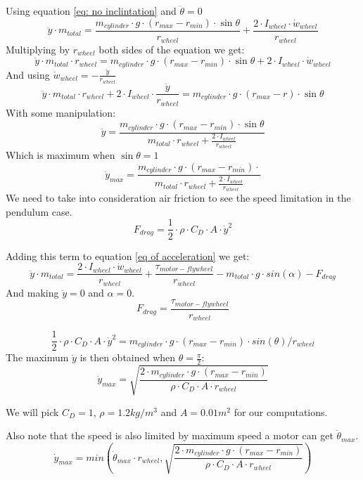 \begin{enumerate}
    Using equation \ref{eq: no inclintation} and $\ddot{\theta} = 0$
    \[\ddot{y}\cdot m_{total} = \frac{m_{cylinder} \cdot  g \cdot  (r_{max} - r_{min}) \cdot  \sin{\theta}}{r_{wheel}} +\frac{2\cdot I_{wheel} \cdot  \dot{w}_{wheel}}{r_{wheel}}\]
    Multiplying by $r_{wheel}$ both sides of the equation we get:
    \[\ddot{y}\cdot m_{total} \cdot  r_{wheel} = m_{cylinder} \cdot  g \cdot  (r_{max}-r_{min}) \cdot  \sin{\theta} + 2\cdot I_{wheel} \cdot  \dot{w}_{wheel}\]
    And using $\dot{w}_{wheel} = -\frac{\ddot{y}}{r_{wheel}}$
    \[\ddot{y}\cdot m_{total} \cdot  r_{wheel} + 2\cdot  I_{wheel} \cdot  \frac{\ddot{y}}{r_{wheel}} = m_{cylinder} \cdot  g \cdot  (r_{max}-r) \cdot  \sin{\theta} \]
    With some manipulation:
    \[\ddot{y}  = \frac{m_{cylinder} \cdot  g \cdot  (r_{max}-r_{min}) \cdot  \sin{\theta}}{m_{total} \cdot  r_{wheel} + \frac{2\cdot I_{wheel}}{r_{wheel}} }  \]
    Which is maximum when $\sin{\theta}=1$
    \begin{equation}
        \boxed{ \ddot{y}_{max}  = \frac{m_{cylinder} \cdot  g \cdot  (r_{max}-r_{min}) \cdot}{m_{total} \cdot  r_{wheel} + \frac{2\cdot I_{wheel}}{r_{wheel}} } }
        \label{maximum acceleration pendulum}
    \end{equation}
    We need to take into consideration air friction to see the speed limitation in the pendulum case.
    \[F_{drag} = \frac{1}{2}\cdot \rho\cdot C_D \cdot  A \cdot  \dot{y}^2 \]

    Adding this term to equation \ref{eq of acceleration} we get:
    \[  \ddot{y}\cdot m_{total} = \frac{2\cdot I_{wheel} \cdot  \dot{w}_{wheel}}{r_{wheel}} + \frac{\tau_{motor-flywheel}}{r_{wheel}} - m_{total} \cdot  g \cdot  sin(\alpha) - F_{drag} \]
    And making $\ddot{y} = 0$ and $\alpha = 0$.
    \[  F_{drag} = \frac{\tau_{motor-flywheel}}{r_{wheel}}\]

    \[\frac{1}{2}\cdot \rho\cdot C_D \cdot  A \cdot  \dot{y}^2 = m_{cylinder} \cdot  g \cdot  (r_{max} - r_{min})\cdot sin(\theta) / r_{wheel} \]
    The maximum $\dot{y}$ is then obtained when $\theta=\frac{\pi}{2}$:
    \begin{equation*}
        \dot{y}_{max} = \sqrt{\frac{2\cdot m_{cylinder} \cdot  g \cdot  (r_{max} - r_{min})}{\rho\cdot C_D \cdot  A \cdot  r_{wheel}} }
    \end{equation*}

    We will pick $C_D=1$, $\rho=1.2 kg/m^3$ and $A=0.01 m^2$ for our computations.

    Also note that the speed is also limited by maximum speed a motor can get
    $\dot{\theta}_{max}$.
    \begin{equation}
        \boxed{\dot{y}_{max} = min(\dot{\theta}_{max}\cdot r_{wheel}, \sqrt{\frac{2\cdot m_{cylinder} \cdot  g \cdot  (r_{max} - r_{min})}{\rho\cdot C_D \cdot  A \cdot  r_{wheel}} })}
        \label{maximum speed pendulum}
    \end{equation}


\end{enumerate}
